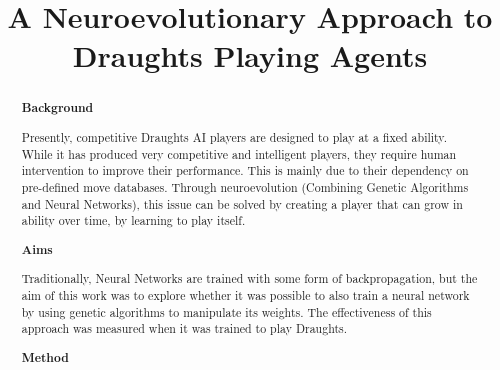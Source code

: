 \documentclass[12pt,a4paper]{article}
\title{A Neuroevolutionary Approach to Draughts Playing Agents}
\author{}
\date{}
\begin{document}
    \maketitle


\begin{abstract}


    {\bf Background}

    Presently, competitive Draughts AI players are designed to play at a fixed ability. While it has produced very competitive and intelligent players, they require human intervention to improve their performance. This is mainly due to their dependency on pre-defined move databases. Through neuroevolution (Combining Genetic Algorithms and Neural Networks), this issue can be solved by creating a player that can grow in ability over time, by learning to play itself.
    
    {\bf Aims}

    Traditionally, Neural Networks are trained with some form of backpropagation, but the aim of this work was to explore whether it was possible to also train a neural network by using genetic algorithms to manipulate its weights. The effectiveness of this approach was measured when it was trained to play Draughts.

    {\bf Method}


\end{abstract}
\end{document}
